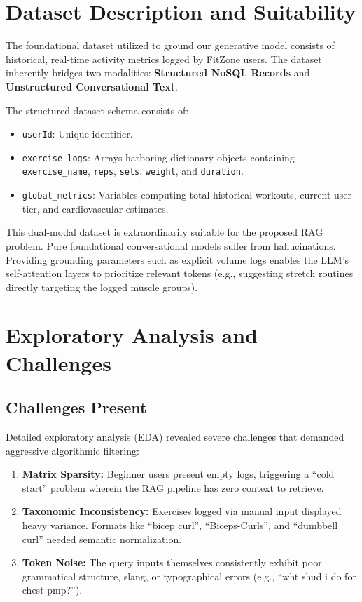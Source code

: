 \documentclass[12pt, a4paper]{report}
\begin{document}
\section{Dataset Description and Suitability}
The foundational dataset utilized to ground our generative model consists of historical, real-time activity metrics logged by FitZone users. The dataset inherently bridges two modalities: \textbf{Structured NoSQL Records} and \textbf{Unstructured Conversational Text}.

The structured dataset schema consists of:
\begin{itemize}
    \item \texttt{userId}: Unique identifier.
    \item \texttt{exercise\_logs}: Arrays harboring dictionary objects containing \texttt{exercise\_name}, \texttt{reps}, \texttt{sets}, \texttt{weight}, and \texttt{duration}.
    \item \texttt{global\_metrics}: Variables computing total historical workouts, current user tier, and cardiovascular estimates.
\end{itemize}

This dual-modal dataset is extraordinarily suitable for the proposed RAG problem. Pure foundational conversational models suffer from hallucinations. Providing grounding parameters such as explicit volume logs enables the LLM's self-attention layers to prioritize relevant tokens (e.g., suggesting stretch routines directly targeting the logged muscle groups).

\section{Exploratory Analysis and Challenges}
\subsection{Challenges Present}
Detailed exploratory analysis (EDA) revealed severe challenges that demanded aggressive algorithmic filtering:
\begin{enumerate}
    \item \textbf{Matrix Sparsity:} Beginner users present empty logs, triggering a ``cold start'' problem wherein the RAG pipeline has zero context to retrieve.
    \item \textbf{Taxonomic Inconsistency:} Exercises logged via manual input displayed heavy variance. Formats like ``bicep curl'', ``Biceps-Curls'', and ``dumbbell curl'' needed semantic normalization.
    \item \textbf{Token Noise:} The query inputs themselves consistently exhibit poor grammatical structure, slang, or typographical errors (e.g., ``wht shud i do for chest pmp?'').
\end{enumerate}
\end{document}
